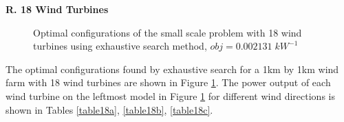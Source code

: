     \textbf{R. 18 Wind Turbines}
        \begin{figure}[H]
            \centering
            \qquad
            \qquad
            \qquad
            \caption{Optimal configurations of the small scale problem with 18 wind turbines using exhaustive search method, $obj=0.002131\;kW^{-1}$}
            \label{small18}
        \end{figure}
        
        The optimal configurations found by exhaustive search for a 1km by 1km wind farm with 18 wind turbines are shown in Figure \ref{small18}. The power output of each wind turbine on the leftmost model in Figure \ref{small18} for different wind directions is shown in Tables \ref{table18a}, \ref{table18b}, \ref{table18c}.
        

